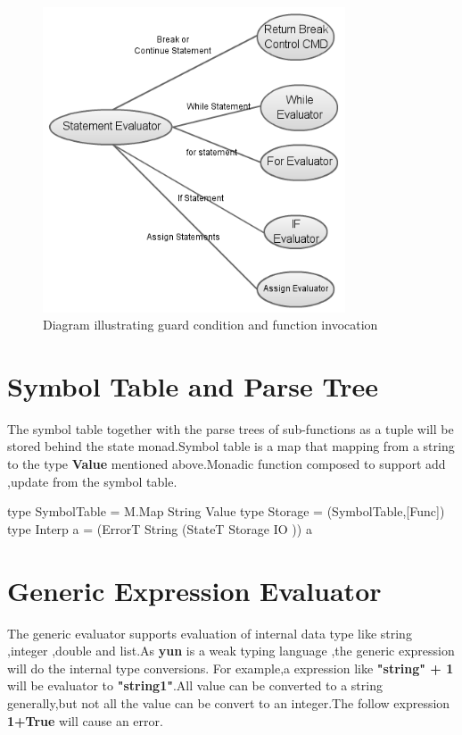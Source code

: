 \begin{figure}[H]
  \centering
	\includegraphics[width=0.80\textwidth]{pic/c6/statement.png}
	\caption{Diagram illustrating guard condition and function invocation}
\end{figure}




\section{Symbol Table and Parse Tree}
The symbol table together with the parse trees of sub-functions as a tuple will be stored behind the state monad.Symbol table is a map that mapping from a string to the type \textbf{Value} mentioned above.Monadic function composed to support add ,update from the symbol table.

\begin{hcode}
type SymbolTable = M.Map String Value
type Storage = (SymbolTable,[Func])
type Interp a  = (ErrorT String (StateT Storage IO )) a
\end{hcode}


\section{Generic Expression Evaluator}
The generic evaluator supports evaluation of internal data type like string ,integer ,double and list.As \textbf{yun} is a weak typing language ,the generic expression will do the internal type conversions. For example,a expression like \textbf{"string" + 1 } will be evaluator to  \textbf{"string1"}.All value can be converted to a string generally,but not all the value can be convert to an integer.The follow expression \textbf{1+True} will cause an error.

